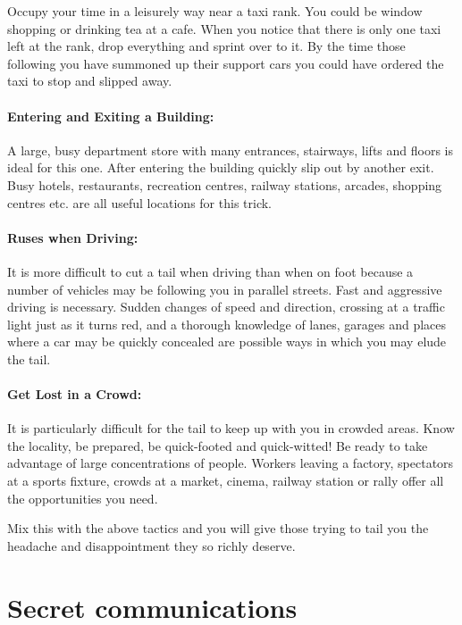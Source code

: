 Occupy your time in a leisurely way near a taxi rank. You could be
window shopping or drinking tea at a cafe. When you notice that there is
only one taxi left at the rank, drop everything and sprint over to it.
By the time those following you have summoned up their support cars you
could have ordered the taxi to stop and slipped away.

\paragraph{Entering and Exiting a Building:}

A large, busy department store with many entrances, stairways, lifts and
floors is ideal for this one. After entering the building quickly slip
out by another exit. Busy hotels, restaurants, recreation centres,
railway stations, arcades, shopping centres etc. are all useful
locations for this trick.

\paragraph{Ruses when Driving:}

It is more difficult to cut a tail when driving than when on foot
because a number of vehicles may be following you in parallel streets.
Fast and aggressive driving is necessary. Sudden changes of speed and
direction, crossing at a traffic light just as it turns red, and a
thorough knowledge of lanes, garages and places where a car may be
quickly concealed are possible ways in which you may elude the tail.

\paragraph{Get Lost in a Crowd:}

It is particularly difficult for the tail to keep up with you in crowded
areas. Know the locality, be prepared, be quick-footed and quick-witted!
Be ready to take advantage of large concentrations of people. Workers
leaving a factory, spectators at a sports fixture, crowds at a market,
cinema, railway station or rally offer all the opportunities you need.

Mix this with the above tactics and you will give those trying to tail
you the headache and disappointment they so richly deserve.

\section{Secret communications}

